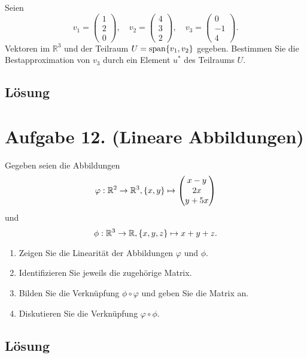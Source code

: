 \documentclass[german,12pt]{homework}
\newcommand{\RR}{\mathbb{R}}
\DeclareMathOperator{\vecspan}{span}
\DeclarePairedDelimiter{\penbrace}{\{}{\}}
\begin{document}
    \begin{problem}
        Seien
        \[v_1 = \begin{pmatrix}1\\2\\0\end{pmatrix}, \quad
        v_2 = \begin{pmatrix}4\\3\\2\end{pmatrix}, \quad
        v_3 = \begin{pmatrix}0\\-1\\4\end{pmatrix}.\]
        Vektoren  im \(\RR^3\) und der Teilraum \(U = \vecspan\penbrace*{v_1, v_2}\) gegeben. Bestimmen Sie die Bestapproximation von \(v_3\) durch ein Element \(u^*\) des Teilraums \(U\).
    \end{problem}

    \subsection*{Lösung} \clearpage

    \section*{Aufgabe 12. (Lineare Abbildungen)}

    \begin{problem}
        Gegeben seien die Abbildungen
        \[\varphi: \RR^2 \to \RR^3, \penbrace*{x, y} \mapsto \begin{pmatrix}x - y\\2x\\y + 5x\end{pmatrix}\]
        und
        \[\phi: \RR^3 \to \RR, \penbrace*{x, y, z} \mapsto x + y + z.\]
        \begin{enumerate}
            \item Zeigen Sie die Linearität der Abbildungen \(\varphi\) und \(\phi\).
            \item Identifizieren Sie jeweils die zugehörige Matrix.
            \item Bilden Sie die Verknüpfung \(\phi \circ \varphi\) und geben Sie die Matrix an.
            \item Diskutieren Sie die Verknüpfung \(\varphi \circ \phi\).
        \end{enumerate}
    \end{problem}

    \subsection*{Lösung} \clearpage
\end{document}

